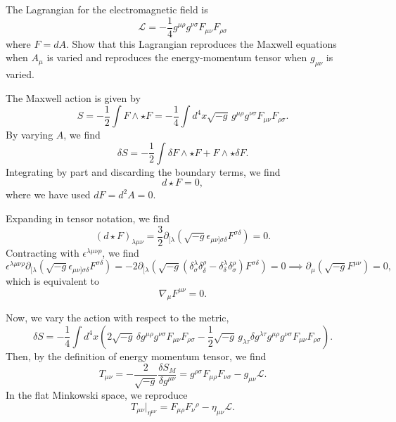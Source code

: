 The Lagrangian for the electromagnetic field is
\begin{equation}
    \mathcal{L} = -\frac{1}{4}g^{\mu\rho}g^{\nu\sigma}F_{\mu\nu}F_{\rho\sigma}
\end{equation}
where $F=dA$. Show that this Lagrangian reproduces the Maxwell equations when $A_\mu$ is varied and reproduces the energy-momentum tensor when $g_{\mu\nu}$ is varied.
\begin{solution}
    The Maxwell action is given by
    \begin{equation}
        S = -\frac{1}{2}\int F\wedge \star F = -\frac{1}{4}\int d^4x \sqrt{-g}\,g^{\mu\rho}g^{\nu\sigma}F_{\mu\nu}F_{\rho\sigma}.
    \end{equation}
    By varying $A$, we find
    \begin{equation}
        \delta S = -\frac{1}{2}\int\delta F\wedge \star F + F \wedge \star \delta F.
    \end{equation}
    Integrating by part and discarding the boundary terms, we find
    \begin{equation}
        d\star F = 0,
    \end{equation}
    where we have used $dF = d^2 A = 0$.

    Expanding in tensor notation, we find
    \begin{equation}
        (d \star F)_{\lambda\mu\nu} = \frac{3}{2}\partial_{[\lambda}(\sqrt{-g}\epsilon_{\mu\nu]\sigma\delta}F^{\sigma\delta}) =0.
    \end{equation}
    Contracting with $\epsilon^{\lambda\mu\nu\rho}$, we find
    \begin{equation}
        \epsilon^{\lambda\mu\nu\rho}\partial_{[\lambda}(\sqrt{-g}\epsilon_{\mu\nu]\sigma\delta}F^{\sigma\delta}) = -2\partial_{[\lambda}\left(\sqrt{-g}(\delta^\lambda_\sigma\delta^\rho_\delta - \delta^\lambda_\delta\delta^\rho_\sigma)F^{\sigma\delta}\right)= 0\implies \partial_\mu (\sqrt{-g}F^{\mu\nu}) = 0,
    \end{equation}
    which is equivalent to 
    \begin{equation}
        \nabla_\mu F^{\mu\nu} = 0.
    \end{equation}

    Now, we vary the action with respect to the metric,
    \begin{equation}
        \delta S = -\frac{1}{4}\int d^4 x\left(2\sqrt{-g}\, \delta g^{\mu\rho}g^{\nu\sigma}F_{\mu\nu}F_{\rho\sigma} -\frac{1}{2}\sqrt{-g}\,g_{\lambda\tau}\delta g^{\lambda\tau}g^{\mu\rho}g^{\nu\sigma}F_{\mu\nu}F_{\rho\sigma} \right).
    \end{equation}
    Then, by the definition of energy momentum tensor, we find
    \begin{equation}
        T_{\mu\nu} = -\frac{2}{\sqrt{-g}}\frac{\delta S_M}{\delta g^{\mu\nu}} = g^{\rho\sigma}F_{\mu\rho}F_{\nu\sigma} - g_{\mu\nu}\mathcal{L}.
    \end{equation}
    In the flat Minkowski space, we reproduce
    \begin{equation}
        T_{\mu\nu}\bigg|_{\eta^{\mu\nu}} = F_{\mu\rho}F_\nu{}^\rho - \eta_{\mu\nu}\mathcal{L}.
    \end{equation}
    
\end{solution}
